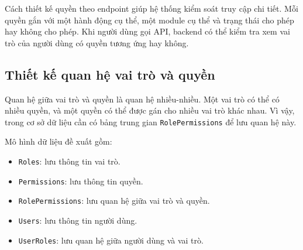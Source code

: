 Cách thiết kế quyền theo endpoint giúp hệ thống kiểm soát truy cập chi tiết. Mỗi quyền gắn với một hành động cụ thể, một module cụ thể và trạng thái cho phép hay không cho phép. Khi người dùng gọi API, backend có thể kiểm tra xem vai trò của người dùng có quyền tương ứng hay không.

\subsection{Thiết kế quan hệ vai trò và quyền}

Quan hệ giữa vai trò và quyền là quan hệ nhiều-nhiều. Một vai trò có thể có nhiều quyền, và một quyền có thể được gán cho nhiều vai trò khác nhau. Vì vậy, trong cơ sở dữ liệu cần có bảng trung gian \texttt{RolePermissions} để lưu quan hệ này.

Mô hình dữ liệu đề xuất gồm:

\begin{itemize}
    \item \texttt{Roles}: lưu thông tin vai trò.
    \item \texttt{Permissions}: lưu thông tin quyền.
    \item \texttt{RolePermissions}: lưu quan hệ giữa vai trò và quyền.
    \item \texttt{Users}: lưu thông tin người dùng.
    \item \texttt{UserRoles}: lưu quan hệ giữa người dùng và vai trò.
\end{itemize}
